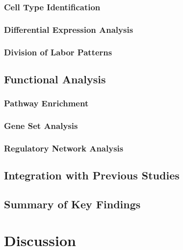 \documentclass[
  11pt,
  a4paper,
]{report}
\begin{document}
\subsection{Cell Type Identification}\label{cell-type-identification}

\subsection{Differential Expression
Analysis}\label{differential-expression-analysis}

\subsection{Division of Labor
Patterns}\label{division-of-labor-patterns}

\section{Functional Analysis}\label{functional-analysis}

\subsection{Pathway Enrichment}\label{pathway-enrichment}

\subsection{Gene Set Analysis}\label{gene-set-analysis}

\subsection{Regulatory Network
Analysis}\label{regulatory-network-analysis}

\section{Integration with Previous
Studies}\label{integration-with-previous-studies}

\section{Summary of Key Findings}\label{summary-of-key-findings}


\chapter{Discussion}\label{discussion}
\end{document}
